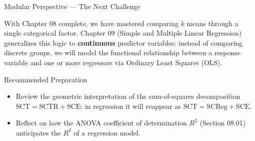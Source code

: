 \documentclass[10pt, aspectratio=169]{beamer}
\begin{document}
\begin{frame}{Modular Perspective --- The Next Challenge}
  \scriptsize
  \begin{retoclase}
    With Chapter 08 complete, we have mastered comparing $k$ means through a single categorical factor. Chapter 09 (Simple and Multiple Linear Regression) generalizes this logic to \textbf{continuous} predictor variables: instead of comparing discrete groups, we will model the functional relationship between a response variable and one or more regressors via Ordinary Least Squares (OLS).
  \end{retoclase}

  \vspace{0.08cm}
  \pause
  \begin{alertblock}{Recommended Preparation}
    \begin{itemize}\itemsep=0.06cm
      \item Review the geometric interpretation of the sum-of-squares decomposition $\text{SCT}=\text{SCTR}+\text{SCE}$: in regression it will reappear as $\text{SCT}=\text{SCReg}+\text{SCE}$.
      \item Reflect on how the ANOVA coefficient of determination $R^2$ (Section 08.01) anticipates the $R^2$ of a regression model.
    \end{itemize}
  \end{alertblock}
\end{frame}
\end{document}
